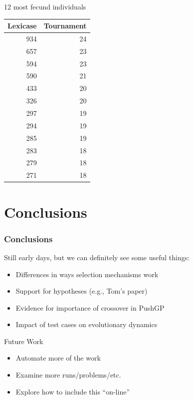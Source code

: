\documentclass{beamer}
\newcommand{\linespace}{\vskip 0.25cm}
\begin{document}
\begin{frame}{12 most fecund individuals}
		\begin{center}
			\begin{tabular}{rr}
				Lexicase & Tournament \\
				\hline\noalign{\smallskip}
				934 & 24 \\
				657 & 23 \\
				594 & 23 \\
				590 & 21 \\
				433 & 20 \\
				326 & 20 \\
				297 & 19 \\
				294 & 19 \\
				285 & 19 \\
				283 & 18 \\
				279 & 18 \\
				271 & 18 \\
			\end{tabular}
		\end{center}
\end{frame}

\section[Conclusions]{Conclusions}

\begin{frame}
\frametitle{Conclusions}

Still early days, but we can definitely see some useful things:
\begin{itemize}
\item Differences in ways selection mechanisms work
\item Support for hypotheses (e.g., Tom's paper)
\item Evidence for importance of crossover in PushGP
\item Impact of test cases on evolutionary dynamics
\end{itemize}

\linespace
\linespace

Future Work
\begin{itemize}
\item Automate more of the work
\item Examine more runs/problems/etc.
\item Explore how to include this ``on-line''
\end{itemize}
\end{frame}
\end{document}
